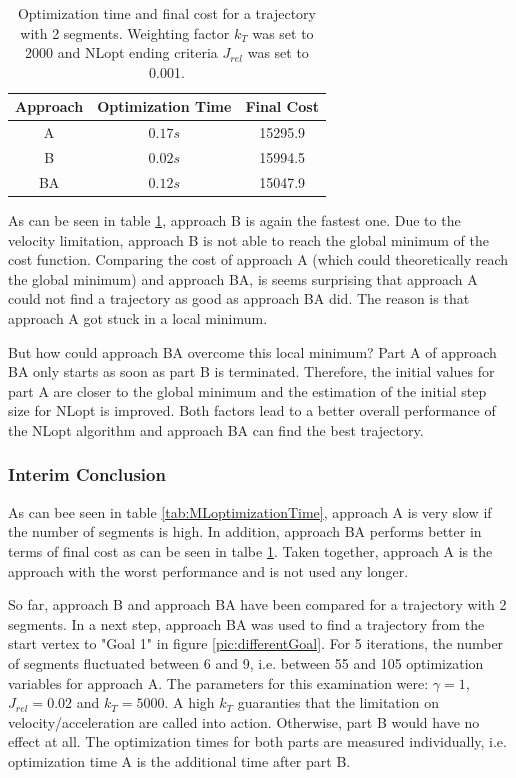\begin{table}[H] 
\begin{center}
    \begin{tabular}{| c | c |  c |}
    \hline
    Approach & Optimization Time & Final Cost \\ \hline
  A & $0.17s$ & 15295.9 \\ \hline
  B & $0.02s$ &  15994.5\\ \hline
 BA & $0.12s$ &  15047.9\\
    \hline
    \end{tabular}
    \caption{Optimization time and final cost for a trajectory with 2 segments. Weighting factor $k_T$ was set to 2000 and NLopt ending criteria $J_{rel}$ was set to 0.001.}
    \label{tab:ABBA2}
\end{center}
\end{table}

As can be seen in table \ref{tab:ABBA2}, approach B is again the fastest one. Due to the velocity limitation, approach B is not able to reach the global minimum of the cost function. Comparing the cost of approach A (which could theoretically reach the global minimum) and approach BA, is seems surprising that approach A could not find a trajectory as good as approach BA did. The reason is that approach A got stuck in a local minimum. \newline

But how could approach BA overcome this local minimum? Part A of approach BA only starts as soon as part B is terminated. Therefore, the initial values for part A are closer to the global minimum and the estimation of the initial step size for NLopt is improved. Both factors lead to a better overall performance of the NLopt algorithm and approach BA can find the best trajectory. \newpage

\subsubsection{Interim Conclusion}

As can bee seen in table \ref{tab:MLoptimizationTime}, approach A is very slow if the number of segments is high. In addition, approach BA performs better in terms of final cost as can be seen in talbe \ref{tab:ABBA2}. Taken together, approach A is the approach with the worst performance and is not used any longer.\newline

So far, approach B and approach BA have been compared for a trajectory with 2 segments. In a next step, approach BA was used to find a trajectory from the start vertex to "Goal 1" in figure \ref{pic:differentGoal}. For 5 iterations, the number of segments fluctuated between 6 and 9, i.e. between 55 and 105 optimization variables for approach A. The parameters for this examination were: $\gamma = 1$, $J_{rel} = 0.02$ and $k_T = 5000$. A high $k_T$ guaranties that the limitation on velocity/acceleration are called into action. Otherwise, part B would have no effect at all. The optimization times for both parts are measured individually, i.e. optimization time A is the additional time after part B.



